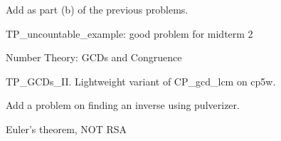 \documentclass[quiz]{mcs}
\begin{document}


{\color{red}
Add as part (b) of the previous problems.
}

\begin{staffnotes}
TP\_uncountable\_example: good problem for midterm 2
\end{staffnotes}

\begin{center}
{\large Number Theory: GCDs and Congruence}
\end{center}




\begin{staffnotes}
TP\_GCDs\_II.  Lightweight variant of CP\_gcd\_lcm on cp5w.
\end{staffnotes}

{\color{red}
Add a problem on finding an inverse using pulverizer.
}

\begin{center}
{\large Euler's theorem, NOT RSA}
\end{center}







\end{document}
